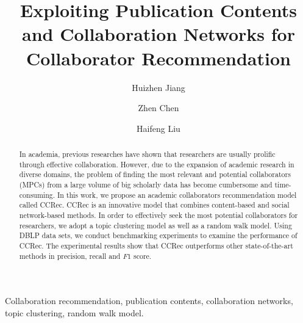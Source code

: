 \documentclass[review]{elsarticle}
\begin{document}
\begin{frontmatter}

\title{Exploiting Publication Contents and Collaboration Networks for Collaborator Recommendation}



%

\author[mymainaddress]{Huizhen Jiang}
\author[mymainaddress]{Zhen Chen}
\author[mymainaddress]{Haifeng Liu}
\address[mymainaddress]{Dalian University of Technology, Dalian, China}
\begin{abstract}
In academia, previous researches have shown that researchers are usually prolific through effective collaboration. However, due to the expansion of academic research in diverse domains, the problem of finding the most relevant and potential collaborators (MPCs) from a large volume of big scholarly data has become cumbersome and time-consuming. In this work, we propose an academic collaborators recommendation model called CCRec. CCRec is an innovative model that combines content-based and social network-based methods. In order to effectively seek the most potential collaborators for researchers, we adopt a topic clustering model as well as a random walk model. Using DBLP data sets, we conduct benchmarking experiments to examine the performance of CCRec. The experimental results show that CCRec outperforms other state-of-the-art methods in precision, recall and $F1$ score.
\end{abstract}

\begin{keyword}
Collaboration recommendation, publication contents, collaboration networks, topic clustering, random walk model.
\end{keyword}

\end{frontmatter}
\end{document}
